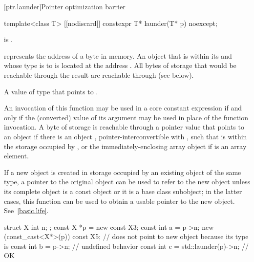 [ptr.launder]{Pointer optimization barrier}

%
\begin{itemdecl}
template<class T> [[nodiscard]] constexpr T* launder(T* p) noexcept;
\end{itemdecl}

\begin{itemdescr}
\pnum
\mandates
{} is .

\pnum
\expects
{} represents the address  of a byte in memory.
An object  that is within its 
and whose type is  to 
is located at the address .
All bytes of storage that would be reachable through the result
are reachable through  (see below).

\pnum
\returns
A value of type  that points to .

\pnum
\remarks
An invocation of this function
may be used in a core constant expression
if and only if the (converted) value of its argument
may be used in place of the function invocation.
A byte of storage  is
reachable through a pointer value
that points to an object 
if there is an object ,
pointer-interconvertible with ,
such that  is within the storage occupied by
, or
the immediately-enclosing array object if  is an array element.

\pnum
\begin{note}
If a new object is created
in storage occupied by an existing object of the same type,
a pointer to the original object
can be used to refer to the new object
unless its complete object is a const object or it is a base class subobject;
in the latter cases,
this function can be used to obtain a usable pointer to the new object.
See~\ref{basic.life}.
\end{note}

\pnum
\begin{example}
\begin{codeblock}
struct X { int n; };
const X *p = new const X{3};
const int a = p->n;
new (const_cast<X*>(p)) const X{5}; //  does not point to new object because its type is 
const int b = p->n;                 // undefined behavior
const int c = std::launder(p)->n;   // OK
\end{codeblock}
\end{example}
\end{itemdescr}

